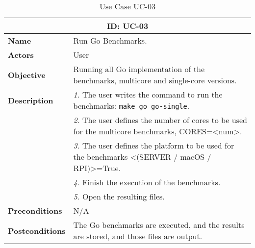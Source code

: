 \begin{table}[H]
    \centering
    \begin{tabular}{l p{10cm}}
        \toprule
        \multicolumn{2}{c}{\textbf{ID: UC-03}} \\
        \toprule
        \textbf{Name}                         &  Run Go Benchmarks. \\
        \textbf{Actors}                       &  User \\
        \textbf{Objective}                    &  Running all Go implementation of the benchmarks, multicore and single-core versions. \\
        \multirow{1}{*}{\textbf{Description}} & \textsl{1.} The user writes the command to run the benchmarks: \texttt{make go go-single}.\\
                                              & \textsl{2.} The user defines the number of cores to be used for the multicore benchmarks, CORES=<num>.\\
                                              & \textsl{3.} The user defines the platform to be used for the benchmarks <(SERVER / macOS / RPI)>=True.\\
                                              & \textsl{4.} Finish the execution of the benchmarks.\\
                                              & \textsl{5.} Open the resulting files.\\ 
        \textbf{Preconditions}                &  N/A \\
        \textbf{Postconditions}               &  The Go benchmarks are executed, and the results are stored, and those files are output. \\
    \end{tabular}
    \caption{Use Case UC-03}
    \label{tab:uc-03}
\end{table}


